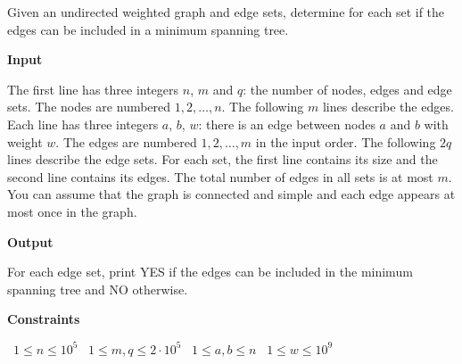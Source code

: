 Given an undirected weighted graph and edge sets, determine for each set if the edges can be included in a minimum spanning tree.

\vspace{0.3cm}\noindent\textbf{Input}

The first line has three integers $n$,  $m$ and $q$: the number of nodes, edges and edge sets. The nodes are numbered $1,2,\dots,n$.
The following $m$ lines describe the edges. Each line has three integers $a$, $b$, $w$: there is an edge between nodes $a$ and $b$ with weight $w$. The edges are numbered $1,2,\dots,m$ in the input order.
The following $2q$ lines describe the edge sets. For each set, the first line contains its size and the second line contains its edges. The total number of edges in all sets is at most $m$.
You can assume that the graph is connected and simple and each edge appears at most once in the graph.

\vspace{0.3cm}\noindent\textbf{Output}

For each edge set, print YES if the edges can be included in the minimum spanning tree and NO otherwise.

\vspace{0.3cm}\noindent\textbf{Constraints}

\textbullet\ $1 \le n \le 10^5$
\textbullet\ $1 \le m, q \le 2 \cdot 10^5$
\textbullet\ $1 \le a,b \le n$
\textbullet\ $1 \le w \le 10^9$